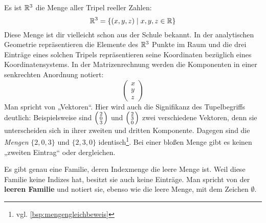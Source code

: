 \begin{bsp} \label{bsp:vektoren}
    Es ist $\mathbb R^3$ die Menge aller Tripel reeller Zahlen:
        \[ \mathbb R^3 = \{(x,y,z) \mid x,y,z\in \mathbb R \} \]
    Diese Menge ist dir vielleicht schon aus der Schule bekannt. In der analytischen Geometrie repräsentieren die Elemente des $\mathbb R^3$ Punkte im Raum und die drei Einträge eines solchen Tripels repräsentieren seine Koordinaten bezüglich eines Koordinatensystems. In der Matrizenrechnung werden die Komponenten in einer senkrechten Anordnung notiert:
    \[\begin{pmatrix}
        x \\ y \\ z 
    \end{pmatrix} \]
    Man spricht von „Vektoren“. Hier wird auch die Signifikanz des Tupelbegriffs deutlich: Beispielsweise sind $\begin{psmallmatrix} 2 \\ 0 \\ 3 \end{psmallmatrix}$ und $\begin{psmallmatrix} 2 \\ 3 \\ 0 \end{psmallmatrix}$ zwei verschiedene Vektoren, denn sie unterscheiden sich in ihrer zweiten und dritten Komponente. Dagegen sind die \emph{Mengen} $\{2,0,3\}$ und $\{2,3,0\}$ identisch\footnote{vgl. \cref{bsp:mengengleichbeweis}}. Bei einer bloßen Menge gibt es keinen „zweiten Eintrag“ oder dergleichen.
\end{bsp}


\begin{defin} \label{def:leerefam}
    Es gibt genau eine Familie, deren Indexmenge die leere Menge ist. Weil diese Familie keine Indizes hat, besitzt sie auch keine Einträge. Man spricht von der \textbf{leeren Familie} und notiert sie, ebenso wie die leere Menge, mit dem Zeichen $\emptyset$.
\end{defin}


